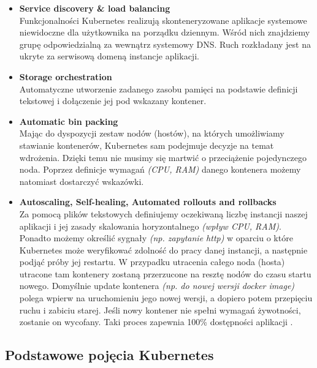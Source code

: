 \begin{itemize}
    \item
    \textbf{Service discovery \& load balancing}\\
    Funkcjonalności Kubernetes realizują skonteneryzowane aplikacje systemowe niewidoczne dla użytkownika na porządku dziennym.
    Wśród nich znajdziemy grupę odpowiedzialną za wewnątrz systemowy DNS. Ruch rozkładany jest na ukryte za serwisową domeną instancje aplikacji. 
    
    \item
    \textbf{Storage orchestration}\\
    Automatyczne utworzenie zadanego zasobu pamięci na podstawie definicji tekstowej i dołączenie jej pod wskazany kontener.

    \item
    \textbf{Automatic bin packing}\\
    \label{bin-packing}
    Mając do dyspozycji zestaw nodów (hostów), na których umożliwiamy stawianie kontenerów, Kubernetes sam podejmuje decyzje na temat wdrożenia.
    Dzięki temu nie musimy się martwić o przeciążenie pojedynczego noda.
    Poprzez definicje wymagań \emph{(CPU, RAM)} danego kontenera możemy natomiast dostarczyć wskazówki. 

    \item
    \textbf{Autoscaling, Self-healing, Automated rollouts and rollbacks}\\
    Za pomocą plików tekstowych definiujemy oczekiwaną liczbę instancji naszej aplikacji i jej zasady skalowania horyzontalnego \emph{(wpływ CPU, RAM)}.
    Ponadto możemy określić sygnały \emph{(np. zapytanie http)} w oparciu o które Kubernetes może weryfikować zdolność do pracy danej instancji, a następnie podjąć próby jej restartu.
    W przypadku utracenia całego noda (hosta) utracone tam kontenery zostaną przerzucone na resztę nodów do czasu startu nowego.
    Domyślnie update kontenera \emph{(np. do nowej wersji docker image)} polega wpierw na uruchomieniu jego nowej wersji, a dopiero potem przepięciu ruchu i zabiciu starej.
    Jeśli nowy kontener nie spełni wymagań żywotności, zostanie on wycofany. Taki proces zapewnia 100\% dostępności aplikacji \cite{k8s-what}.
\end{itemize} 

\subsection{Podstawowe pojęcia Kubernetes}

